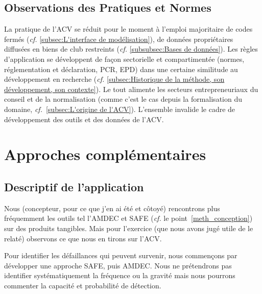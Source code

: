 \subsection{Observations des Pratiques et Normes}

La pratique de l'\gls{ACV} se réduit pour le moment à l'emploi majoritaire de codes fermés (\textit{cf.} \ref{subsec:L'interface de modélisation}), de données propriétaires diffusées en biens de club restreints (\textit{cf.} \ref{subsubsec:Bases de données}).
Les règles d'application se développent de façon sectorielle et compartimentée (normes, réglementation et déclaration, \gls{PCR}, \gls{EPD}) dans une certaine similitude au développement en recherche (\textit{cf.} \ref{subsec:Historique de la méthode, son développement, son contexte}).
Le tout alimente les secteurs entrepreneuriaux du conseil et de la normalisation (comme c'est le cas depuis la formalisation du domaine, \textit{cf.}~\ref{subsec:L'origine de l'ACV}).
L'ensemble invalide le cadre de développement des outils et des données de l'\gls{ACV}.





\section{Approches complémentaires}
\subsection{Descriptif de l'application}
Nous (concepteur, pour ce que j'en ai été et côtoyé) rencontrons plus fréquemment les outils tel l'AMDEC et SAFE (\textit{cf.} le point~\ref{meth_conception}) sur des produits tangibles.
Mais pour l'exercice (que nous avons jugé utile de le relaté) observons ce que nous en tirons sur l'\gls{ACV}.

Pour identifier les défaillances qui peuvent survenir, nous commençons par développer une approche SAFE, puis AMDEC.
Nous ne prétendrons pas identifier systématiquement la fréquence ou la gravité mais nous pourrons commenter la capacité et probabilité de détection.
